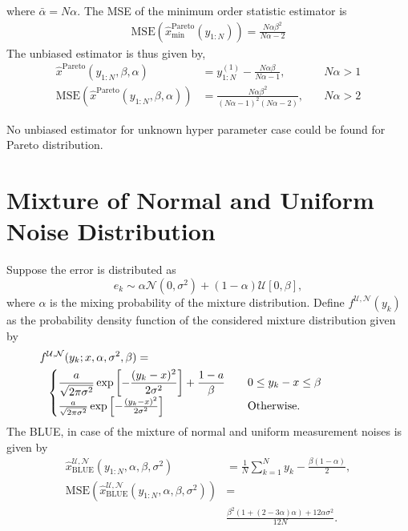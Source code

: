 \documentclass{article}
\newcommand{\MSE}{\mathrm{MSE}}
\begin{document}
%
%
where $\bar{\alpha}=N\alpha$. The MSE of the minimum order statistic estimator is 
%
%
\begin{align}
\MSE(\hat{x}_{\mathrm{min}}^{\mathrm{Pareto}}(y_{1:N})) =  \frac{N\alpha\beta^2}{N\alpha-2}
\end{align}
%
%
The unbiased estimator is thus given by,
%
%
\begin{subequations}
	\begin{align}
	\hat{x}^{\mathrm{Pareto}}(y_{1:N},\beta,\alpha) &= y^{(1)}_{1:N} - \frac{N\alpha\beta}{N\alpha-1},&\quad N\alpha>1
	\\
	\MSE(\hat{x}^{\mathrm{Pareto}}(y_{1:N},\beta,\alpha)) &=\frac{N\alpha\beta^2}{(N\alpha-1)^2(N\alpha-2)},&\quad N\alpha>2
	\end{align}
\end{subequations}
%
%

No unbiased estimator for unknown hyper parameter case could be found for Pareto distribution. 
\section{Mixture of Normal and Uniform Noise Distribution} 
Suppose the error is distributed as \[ e_k\sim \alpha\mathcal{N}(0,\sigma^2) + (1-\alpha) \mathcal{U}[0,\beta],\] where $\alpha$ is the mixing probability of the mixture distribution. Define $f^{\mathrm{\mathcal{U},\mathcal{N}}}(y_k)$ as the probability density function of the considered mixture distribution given by
%
%
\begin{align}\label{eq:mixture_pdf}
f&^{\mathrm{\mathcal{U},\mathcal{N}}}(y_k;x,\alpha,\sigma^2,\beta) =\nonumber\\
&\begin{cases}
\begin{aligned}
& \frac{a}{\sqrt{2\pi\sigma^2}}\exp\left[-\frac{(y_k-x)^2}{2\sigma^2}\right] +\frac{1-a}{\beta}		\end{aligned} & \parbox[t]{4cm}{\raggedright $0\leq y_k-x\leq \beta$}\\
\frac{a}{\sqrt{2\pi\sigma^2}}\exp\left[-\frac{(y_k-x)^2}{2\sigma^2}\right] & \parbox[t]{4cm}{\raggedright Otherwise.}\\
\end{cases} 
\end{align}
%
%
The BLUE, in case of the mixture of normal and uniform measurement noises is given by
%
%
\begin{subequations}
	\begin{align}
	\hat{x}_{\mathrm{BLUE}}^{\mathrm{\mathrm{\mathcal{U},\mathcal{N}}}}(y_{1:N},\alpha,\beta,\sigma^2) &= \frac{1}{N}\sum_{k=1}^{N}y_k - \frac{\beta(1-\alpha)}{2},
	\\
	\MSE\left(\hat{x}_{\mathrm{BLUE}}^{\mathrm{\mathrm{\mathcal{U},\mathcal{N}}}}(y_{1:N},\alpha,\beta,\sigma^2)\right) &=\nonumber\\ &\frac{\beta^2  \left(1+(2-3\alpha)\alpha\right)+12\alpha\sigma^2}{12N}.
	\end{align}
\end{subequations}
\end{document}
